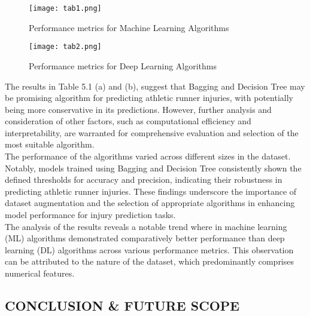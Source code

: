 \documentclass[12pt, English]{article}
\newcommand\tab[1][1cm]{\hspace*{#1}}
\begin{document}
\begin{normalsize}
\begin{figure}[htbp]
  \centering
  \texttt{[image: tab1.png]}
  \captionsetup{type=table, labelformat=simple} %
  \renewcommand{\thetable}{5.1(a)} %
  \caption{\footnotesize Performance metrics for Machine Learning Algorithms}
  \label{fig:tab1}
\end{figure}

\begin{figure}[htbp]
  \centering
  \texttt{[image: tab2.png]}
  \captionsetup{type=table, labelformat=simple} %
  \renewcommand{\thetable}{5.1(b)} %
  \caption{\footnotesize Performance metrics for Deep Learning Algorithms}
  \label{fig:tab2}
\end{figure}

\tab
The results in Table 5.1 (a) and (b), suggest that Bagging and Decision Tree may be promising algorithm for predicting athletic runner injuries, with potentially being more conservative in its predictions. However, further analysis and consideration of other factors, such as computational efficiency and interpretability, are warranted for comprehensive evaluation and selection of the most suitable algorithm.\\
\tab
The performance of the algorithms varied across different sizes in the dataset. Notably, models trained using Bagging and Decision Tree consistently shown the defined thresholds for accuracy and precision, indicating their robustness in predicting athletic runner injuries. These findings underscore the importance of dataset augmentation and the selection of appropriate algorithms in enhancing model performance for injury prediction tasks.\\
\tab
The analysis of the results reveals a notable trend where in machine learning (ML) algorithms demonstrated comparatively better performance   than   deep   learning (DL) algorithms across various performance metrics. This observation can be attributed to the nature of the dataset, which predominantly comprises numerical features.\\





\newpage
\begin{center}
\section{ \Large CONCLUSION \& FUTURE SCOPE}
\end{center}


\end{normalsize}
\end{document}
